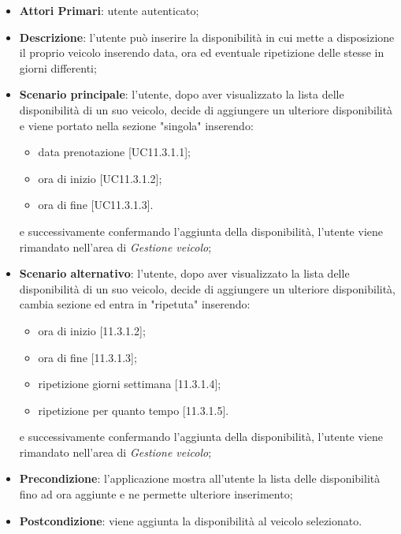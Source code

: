 \begin{itemize}
	\item \textbf{Attori Primari}: utente autenticato;
	\item \textbf{Descrizione}: l'utente può inserire la disponibilità in cui mette a disposizione il proprio veicolo inserendo data, ora ed eventuale ripetizione delle stesse in giorni differenti;
	\item \textbf{Scenario principale}: l'utente, dopo aver visualizzato la lista delle disponibilità di un suo veicolo, decide di aggiungere un ulteriore disponibilità e viene portato nella sezione "singola" inserendo:
	\begin{itemize}
		\item data prenotazione [UC11.3.1.1];
		\item ora di inizio [UC11.3.1.2];
		\item ora di fine [UC11.3.1.3].
	\end{itemize}
	e successivamente confermando l'aggiunta della disponibilità, l'utente viene rimandato nell'area di \textit{Gestione veicolo};
	\item \textbf{Scenario alternativo}: l'utente, dopo aver visualizzato la lista delle disponibilità di un suo veicolo, decide di aggiungere un ulteriore disponibilità, cambia sezione ed entra in "ripetuta" inserendo:
	\begin{itemize}
		\item ora di inizio [11.3.1.2];
		\item ora di fine [11.3.1.3];
		\item ripetizione giorni settimana [11.3.1.4];
		\item ripetizione per quanto tempo [11.3.1.5].
	\end{itemize}
	e successivamente confermando l'aggiunta della disponibilità, l'utente viene rimandato nell'area di \textit{Gestione veicolo};
	\item \textbf{Precondizione}: l'applicazione mostra all'utente la lista delle disponibilità fino ad ora aggiunte e ne permette ulteriore inserimento;
	\item \textbf{Postcondizione}: viene aggiunta la disponibilità al veicolo selezionato.
\end{itemize}
